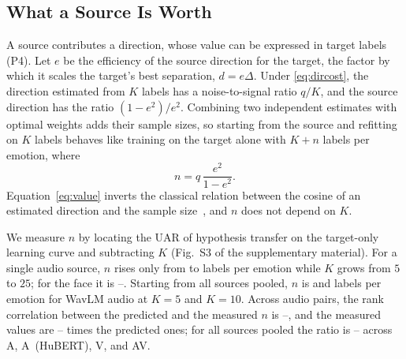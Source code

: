 \subsection{What a Source Is Worth}
\label{sec:part1-value}

A source contributes a direction, whose value can be expressed in target labels (P4).
Let $e$ be the efficiency of the source direction for the target, the factor by which it scales the target's best separation, $d = e\Delta$.
Under \eqref{eq:dircost}, the direction estimated from $K$ labels has a noise-to-signal ratio $q/K$, and the source direction has the ratio $(1 - e^2)/e^2$.
Combining two independent estimates with optimal weights adds their sample sizes, so starting from the source and refitting on $K$ labels behaves like training on the target alone with $K + n$ labels per emotion, where
\begin{equation}
\label{eq:value}
n = q\,\frac{e^2}{1 - e^2}.
\end{equation}
Equation~\eqref{eq:value} inverts the classical relation between the cosine of an estimated direction and the sample size~\cite{raudys1998intrinsic,dobriban2018highdimensional}, and $n$ does not depend on $K$.

We measure $n$ by locating the UAR of hypothesis transfer on the target-only learning curve and subtracting $K$ (Fig.~S3 of the supplementary material).
For a single audio source, $n$ rises only from  to  labels per emotion while $K$ grows from $5$ to $25$; for the face it is --.
Starting from all sources pooled, $n$ is  and  labels per emotion for WavLM audio at $K=5$ and $K=10$.
Across audio pairs, the rank correlation between the predicted and the measured $n$ is --, and the measured values are -- times the predicted ones; for all sources pooled the ratio is -- across A, A~(HuBERT), V, and AV.

